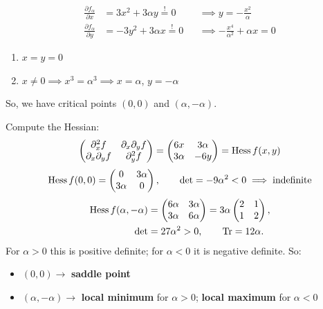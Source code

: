 \begin{exercisesolution}
\[
\begin{aligned}
\frac{\partial f_\alpha}{\partial x} &= 3x^2 + 3\alpha y \overset{!}{=} 0 &&\implies y = -\frac{x^2}{\alpha} \\
\frac{\partial f_\alpha}{\partial y} &= -3y^2 + 3\alpha x \overset{!}{=} 0 &&\implies -\frac{x^4}{\alpha^2} + \alpha x = 0
\end{aligned}
\]
\begin{enumerate}[label=\textbf{(\alph*)}]
  \item $x = y = 0$
  \item $x \neq 0 \implies x^3 = \alpha^3 \implies x = \alpha$, $y = -\alpha$
\end{enumerate}
So, we have critical points $(0,0)$ and $(\alpha, -\alpha)$.

Compute the Hessian:
\[\begin{pmatrix} \partial_x^2 f & \partial_x\partial_y f \\ \partial_x\partial_y f & \partial_y^2 f\end{pmatrix} = \begin{pmatrix} 6x & 3\alpha \\ 3\alpha & -6y \end{pmatrix} = \operatorname{Hess} f(x,y)\]
\[\operatorname{Hess} f(0,0) = \begin{pmatrix} 0 & 3\alpha \\ 3\alpha & 0\end{pmatrix}, \qquad \det = -9\alpha^2 < 0 \implies \text{indefinite}\]
\begin{align*}
\operatorname{Hess} f(\alpha,-\alpha) &= \begin{pmatrix} 6\alpha & 3\alpha \\ 3\alpha & 6\alpha\end{pmatrix}
  = 3\alpha\begin{pmatrix} 2 & 1 \\ 1 & 2\end{pmatrix}, \\
\det &= 27\alpha^2 > 0, \qquad \operatorname{Tr} = 12\alpha.
\end{align*}
For $\alpha > 0$ this is positive definite; for $\alpha < 0$ it is negative definite. So:
\begin{itemize}
  \item $(0,0) \longrightarrow$ \textbf{saddle point}
  \item $(\alpha,-\alpha) \longrightarrow$ \textbf{local minimum} for $\alpha > 0$; \textbf{local
    maximum} for $\alpha < 0$
\end{itemize}
\end{exercisesolution}

